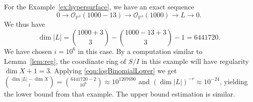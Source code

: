 \documentclass[12pt]{amsart}
\theoremstyle{remark}
\newtheorem{remark}[lemma]{Remark}
\newcommand{\reg}{\operatorname{reg}}
\newcommand{\cO}{{\mathcal O}}
\newcommand{\codim}{\operatorname{codim}}
\newcommand{\PP}{\mathbb P}
\begin{document}
For the Example~\ref{ex:hypersurface}, we have an exact sequence
\[
0\to \cO_{\PP^3}(1000-13) \to \cO_{\PP^3}(1000)\to L\to 0.
\]
We thus have
\[
\dim |L| = \binom{1000+3}{3} - \binom{1000-13 + 3}{3} - 1 = 6441720.
\]
We have chosen $i=10^{6}$ in this case.  By a computation similar to Lemma~\ref{lem:reg}, the coordinate ring of $S/I$ in this example will have regularity $\dim X + 1 =3$.
Applying \eqref{eqn:logBinomialLower} we get $\binom{\dim |L|-\dim X}{i} = \binom{6441720 - 2}{10^6}\approx 10^{1207690}$ and $(\dim |L|)^{-r}\approx 10^{-24}$, yielding the lower bound from that example.  The upper bound estimation is similar.


%
\end{document}
